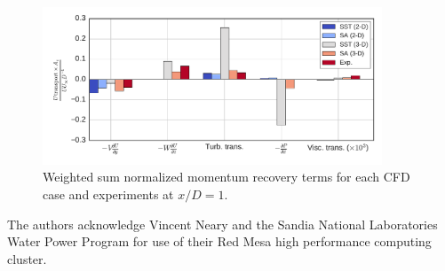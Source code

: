 \documentclass[aip,graphicx]{revtex4-1}
\begin{document}
\begin{figure}[ht]
    \includegraphics[width=0.9\textwidth]{figures/mom_bar_graph}
    \caption{Weighted sum normalized momentum recovery terms for each CFD case
        and experiments\cite{Bachant2015-JoT} at $x/D=1$.} \label{fig:recovery}
\end{figure}


\begin{acknowledgments}
The authors acknowledge Vincent Neary and the Sandia National Laboratories Water
Power Program for use of their Red Mesa high performance computing cluster.
\end{acknowledgments}


\end{document}
